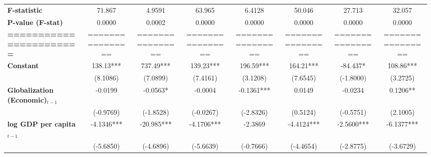 \begin{center}
\begin{tabular}{lccccccc}
\textbf{F-statistic}               &        71.867        &            4.9591           &            63.965            &                6.4128               &              50.046              &            27.713           &             32.057             \\
\textbf{P-value (F-stat)}          &        0.0000        &            0.0002           &            0.0000            &                0.0000               &              0.0000              &            0.0000           &             0.0000             \\
\textbf{=======================}   &   ================   &       ================      &       ================       &           ================          &         ================         &       ================      &        ================        \\
\textbf{Constant}                     &      138.13***       &          737.49***          &          139.23***           &              196.59***              &            164.21***             &           -84.437*          &           108.86***            \\
\textbf{ }                         &       (8.1086)       &           (7.0899)          &           (7.4161)           &               (3.1208)              &             (7.6545)             &          (-1.8000)          &            (3.2725)            \\
\textbf{Globalization (Economic)$_{t-1}$}             &       -0.0199        &           -0.0563*          &           -0.0004            &              -0.1361***             &              0.0149              &           -0.0234           &            0.1206**            \\
\textbf{ }                         &      (-0.9769)       &          (-1.8528)          &          (-0.0267)           &              (-2.8326)              &             (0.5124)             &          (-0.5751)          &            (2.1005)            \\
\textbf{log GDP per capita$_{t-1}$}           &      -4.1346***      &          -20.985***         &          -4.1706***          &               -2.3869               &            -4.4124***            &          -2.5600***         &           -6.1377***           \\
\textbf{ }                         &      (-5.6850)       &          (-4.6896)          &          (-5.6639)           &              (-0.7666)              &            (-4.4654)             &          (-2.8775)          &           (-3.6729)            \\

\end{tabular}
\end{center}
